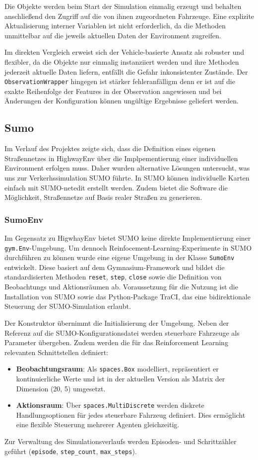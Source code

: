 Die Objekte werden beim Start der Simulation einmalig erzeugt und behalten anschließend den Zugriff auf die von ihnen zugeordneten Fahrzeuge. Eine explizite Aktualisierung interner Variablen ist nicht erforderlich, da die Methoden unmittelbar auf die jeweils aktuellen Daten der Environment zugreifen.

Im direkten Vergleich erweist sich der Vehicle-basierte Ansatz als robuster und flexibler, da die Objekte nur einmalig instanziiert werden und ihre Methoden jederzeit aktuelle Daten liefern, entfällt die Gefahr inkonsistenter Zustände. Der \texttt{ObservationWrapper} hingegen ist stärker fehleranfälligm denn er ist auf die exakte Reihenfolge der Features in der Observation angewiesen und bei Änderungen der Konfiguration können ungültige Ergebnisse geliefert werden.

\subsection{Sumo}
Im Verlauf des Projektes zeigte sich, dass die Definition eines eigenen Straßennetzes in HighwayEnv über die Implpementierung einer individuellen Environment erfolgen muss. Daher wurden alternative Lösungen untersucht, was uns zur Verkerhssimulation SUMO führte. In SUMO können individuelle Karten einfach mit SUMO-netedit erstellt werden. Zudem bietet die Software die Möglichkeit, Straßennetze auf Basis realer Straßen zu generieren.
\subsubsection{SumoEnv}
Im Gegensatz zu HigwhayEnv bietet SUMO keine direkte Implementierung einer \texttt{gym.Env}-Umgebung. Um dennoch Reinfocement-Learning-Experimente in SUMO durchführen zu können wurde eine eigene Umgebung in der Klasse \texttt{SumoEnv} entwickelt. Diese basiert auf dem Gymnasium-Framework und bildet die standardisierten Methoden \texttt{reset}, \texttt{step}, \texttt{close} sowie die Definition von Beobachtungs und Aktionsräumen ab. Voraussetzung für die Nutzung ist die Installation von SUMO sowie das Python-Package TraCI, das eine bidirektionale Steuerung der SUMO-Simulation erlaubt.

Der Konstruktor übernimmt die Initialisierung der Umgebung. Neben der Referenz auf die SUMO-Konfigurationsdatei werden steuerbare Fahrzeuge als Parameter übergeben. Zudem werden die für das Reinforcement Learning relevanten Schnittstellen definiert:
\begin{itemize}
    \item \textbf{Beobachtungsraum}: Als \texttt{spaces.Box} modelliert, repräsentiert er kontinuierliche Werte und ist in der aktuellen Version als Matrix der Dimension (20, 5) umgesetzt.
    \item \textbf{Aktionsraum}: Über \texttt{spaces.MultiDiscrete} werden diskrete Handlungsoptionen für jedes steuerbare Fahrzeug definiert. Dies ermöglicht eine flexible Steuerung mehrerer Agenten gleichzeitig.
\end{itemize}
Zur Verwaltung des Simulationsverlaufs werden Episoden- und Schrittzähler geführt (\texttt{episode}, \texttt{step\_count}, \texttt{max\_steps}).

